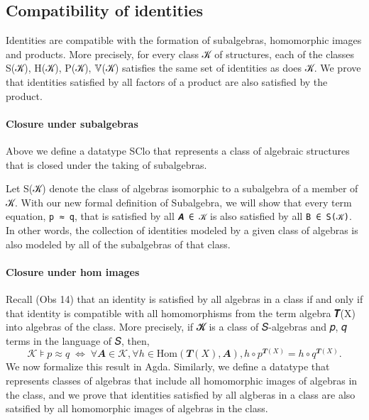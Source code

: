\documentclass[a4paper,USenglish,cleveref,autoref,thm-restate]{lipics-v2019}
\begin{document}
\subsection{Compatibility of identities}\label{sec:compatibility-of-identities}
Identities are compatible with the formation of subalgebras, homomorphic images and products. More precisely, for every class 𝒦 of structures, each of the classes S(𝒦), H(𝒦), P(𝒦), 𝕍(𝒦) satisfies the same set of identities as does 𝒦. We prove that identities satisfied by all factors of a product are also satisfied by the product.
\begin{code}\end{code}

\paragraph*{Closure under subalgebras}
Above we define a datatype SClo that represents a class of algebraic structures that is closed under the taking of subalgebras.

Let S(𝒦) denote the class of algebras isomorphic to a subalgebra of a member of 𝒦. With our new formal definition of Subalgebra, we will show that every term equation, \texttt{p\ ≈\ q}, that is satisfied by all \texttt{𝑨\ ∈\ 𝒦} is also satisfied by all \texttt{B\ ∈\ S(𝒦)}. In other words, the collection of identities modeled by a given class of algebras is also modeled by all of the subalgebras of that class.
\begin{code}\end{code}

\paragraph*{Closure under hom images}
Recall (Obs 14) that an identity is satisfied by all algebras in a class if and only if that identity is compatible with all homomorphisms from the term algebra 𝑻(X) into algebras of the class. More precisely, if 𝓚 is a class of 𝑆-algebras and 𝑝, 𝑞 terms in the language of 𝑆, then,
\[𝒦 ⊧ p ≈ q \; ⇔ \; ∀ 𝑨 ∈ 𝒦, ∀ h ∈ \mathrm{Hom}(𝑻(X), 𝑨), h ∘ p^{𝑻(X)} = h ∘ q^{𝑻(X)}.\]
We now formalize this result in Agda. Similarly, we define a datatype that represents classes of algebras that include all homomorphic images of algebras in the class, and we prove that identities satisfied by all algberas in a class are also satsified by all homomorphic images of algebras in the class.
\begin{code}\end{code}
\end{document}
